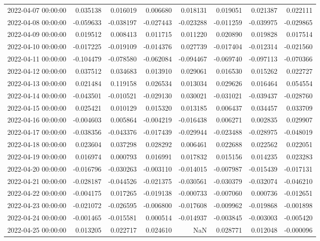 \begin{tabular}{lrrrrrrr}
2022-04-07 00:00:00 & 0.035138 & 0.016019 & 0.006680 & 0.018131 & 0.019051 & 0.021387 & 0.022111 \\
2022-04-08 00:00:00 & -0.059633 & -0.038197 & -0.027443 & -0.023288 & -0.011259 & -0.039975 & -0.029865 \\
2022-04-09 00:00:00 & 0.019512 & 0.008413 & 0.011715 & 0.011220 & 0.020890 & 0.019828 & 0.017514 \\
2022-04-10 00:00:00 & -0.017225 & -0.019109 & -0.014376 & 0.027739 & -0.017404 & -0.012314 & -0.021560 \\
2022-04-11 00:00:00 & -0.104479 & -0.078580 & -0.062084 & -0.094467 & -0.069740 & -0.097113 & -0.070366 \\
2022-04-12 00:00:00 & 0.037512 & 0.034683 & 0.013910 & 0.029061 & 0.016530 & 0.015262 & 0.022727 \\
2022-04-13 00:00:00 & 0.021484 & 0.119158 & 0.026534 & 0.013034 & 0.029626 & 0.016464 & 0.054554 \\
2022-04-14 00:00:00 & -0.043501 & -0.010521 & -0.029130 & 0.030021 & -0.031021 & -0.039437 & -0.028760 \\
2022-04-15 00:00:00 & 0.025421 & 0.010129 & 0.015320 & 0.013185 & 0.006437 & 0.034457 & 0.033709 \\
2022-04-16 00:00:00 & -0.004603 & 0.005864 & -0.004219 & -0.016438 & 0.006271 & 0.002835 & 0.029907 \\
2022-04-17 00:00:00 & -0.038356 & -0.043376 & -0.017439 & -0.029944 & -0.023488 & -0.028975 & -0.048019 \\
2022-04-18 00:00:00 & 0.023604 & 0.037298 & 0.028292 & 0.006461 & 0.022688 & 0.022562 & 0.022051 \\
2022-04-19 00:00:00 & 0.016974 & 0.000793 & 0.016991 & 0.017832 & 0.015156 & 0.014235 & 0.023283 \\
2022-04-20 00:00:00 & -0.016796 & -0.030263 & -0.003110 & -0.014015 & -0.007987 & -0.015439 & -0.017131 \\
2022-04-21 00:00:00 & -0.028187 & -0.044526 & -0.021375 & -0.030561 & -0.030379 & -0.032074 & -0.046210 \\
2022-04-22 00:00:00 & -0.004175 & 0.017265 & -0.019138 & -0.000733 & -0.007060 & 0.000736 & -0.012651 \\
2022-04-23 00:00:00 & -0.021072 & -0.026595 & -0.006800 & -0.017608 & -0.009962 & -0.019868 & -0.001898 \\
2022-04-24 00:00:00 & -0.001465 & -0.015581 & 0.000514 & -0.014937 & -0.003845 & -0.003003 & -0.005420 \\
2022-04-25 00:00:00 & 0.013205 & 0.022717 & 0.024610 & NaN & 0.028771 & 0.012048 & -0.000096 \\

\end{tabular}
